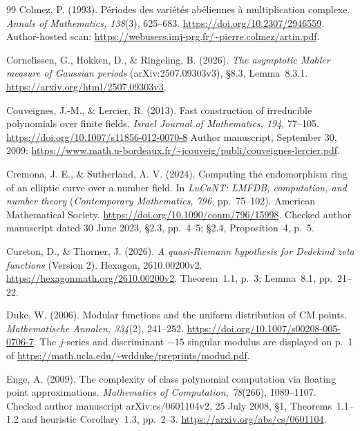 \documentclass[11pt]{article}
\theoremstyle{definition}
\theoremstyle{remark}
\begin{document}
\begin{thebibliography}{99}
Colmez, P. (1993).
P\'eriodes des vari\'et\'es ab\'eliennes \`a multiplication complexe.
\emph{Annals of Mathematics, 138}(3), 625--683.
\url{https://doi.org/10.2307/2946559}.
Author-hosted scan: \url{https://webusers.imj-prg.fr/~pierre.colmez/artin.pdf}.

Cornelissen, G., Hokken, D., \& Ringeling, B. (2026).
\emph{The asymptotic Mahler measure of Gaussian periods}
(arXiv:2507.09303v3), \S8.3, Lemma~8.3.1.
\url{https://arxiv.org/html/2507.09303v3}.

Couveignes, J.-M., \& Lercier, R. (2013).
Fast construction of irreducible polynomials over finite fields.
\emph{Israel Journal of Mathematics, 194}, 77--105.
\url{https://doi.org/10.1007/s11856-012-0070-8}
Author manuscript, September 30, 2009:
\url{https://www.math.u-bordeaux.fr/~jcouveig/publi/couveignes-lercier.pdf}.

Cremona, J. E., \& Sutherland, A. V. (2024).
Computing the endomorphism ring of an elliptic curve over a number field.
In \emph{LuCaNT: LMFDB, computation, and number theory}
(\emph{Contemporary Mathematics, 796}, pp.~75--102).
American Mathematical Society.
\url{https://doi.org/10.1090/conm/796/15998}.
Checked author manuscript dated 30 June 2023, \S2.3, pp.~4--5;
\S2.4, Proposition~4, p.~5.

Cureton, D., \& Thorner, J. (2026).
\emph{A quasi-Riemann hypothesis for Dedekind zeta functions}
(Version 2). Hexagon, 2610.00200v2.
\url{https://hexagonmath.org/2610.00200v2}.
Theorem~1.1, p.~3; Lemma~8.1, pp.~21--22.

Duke, W. (2006).
Modular functions and the uniform distribution of CM points.
\emph{Mathematische Annalen, 334}(2), 241--252.
\url{https://doi.org/10.1007/s00208-005-0706-7}.
The $j$-series and discriminant $-15$ singular modulus are displayed
on p.~1 of \url{https://math.ucla.edu/~wdduke/preprints/modud.pdf}.

Enge, A. (2009).
The complexity of class polynomial computation via floating point
approximations.
\emph{Mathematics of Computation, 78}(266), 1089--1107.
Checked author manuscript arXiv:cs/0601104v2, 25 July 2008,
\S1, Theorems~1.1--1.2 and heuristic Corollary~1.3, pp.~2--3.
\url{https://arxiv.org/abs/cs/0601104}.


\end{thebibliography}
\end{document}
